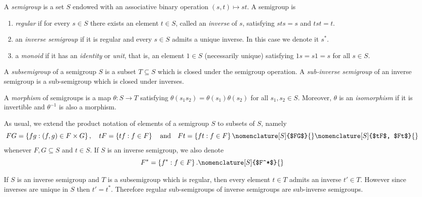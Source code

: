 \begin{definition}\label{definitioninversesemigroup}
A \emph{semigroup} is a set $S$ endowed with an associative binary operation $(s,t)\mapsto st$. A semigroup is
\begin{enumerate}
\item \emph{regular} if for every $s\in S$ there exists an element $t\in S$, called an \emph{inverse} of $s$, satisfying $sts=s$ and $tst=t$.
\item an \emph{inverse semigroup} if it is regular and every $s\in S$ admits a unique inverse. In this case we denote it $s^*$.
\item a \emph{monoid} if it has an \emph{identity} or \emph{unit}, that is, an element $1\in S$ (necessarily unique) satisfying $1s=s1=s$ for all $s\in S$.
\end{enumerate}
A \emph{subsemigroup} of a semigroup $S$ is a subset $T\subseteq S$ which is closed under the semigroup operation. A \emph{sub-inverse semigroup} of an inverse semigroup is a sub-semigroup which is closed under inverses.
\end{definition}

\begin{definition}\label{definitionmorphismofsemigroups}
A \emph{morphism} of semigroups is a map $\theta:S\to T$ satisfying $\theta(s_1s_2)=\theta(s_1)\theta(s_2)$ for all $s_1,s_2\in S$. Moreover, $\theta$ is an \emph{isomorphism} if it is invertible and $\theta^{-1}$ is also a morphism.
\end{definition}

As usual, we extend the product notation of elements of a semigroup $S$ to subsets of $S$, namely
\[FG=\left\{fg:(f,g)\in F\times G\right\},\quad tF=\left\{tf:f\in F\right\}\quad\text{and}\quad Ft=\left\{ft:f\in F\right\}\nomenclature[S]{$FG$}{}\nomenclature[S]{$tF$, $Ft$}{}\]
whenever $F,G\subseteq S$ and $t\in S$. If $S$ is an inverse semigroup, we also denote
\[F^*=\left\{f^*:f\in F\right\}.\nomenclature[S]{$F^*$}{}\]

\begin{remark}\label{remarksubinversesemigroups}
If $S$ is an inverse semigroup and $T$ is a subsemigroup which is regular, then every element $t\in T$ admits an inverse $t'\in T$. However since inverses are unique in $S$ then $t'=t^*$. Therefore regular sub-semigroups of inverse semigroups are sub-inverse semigroups.
\end{remark}

